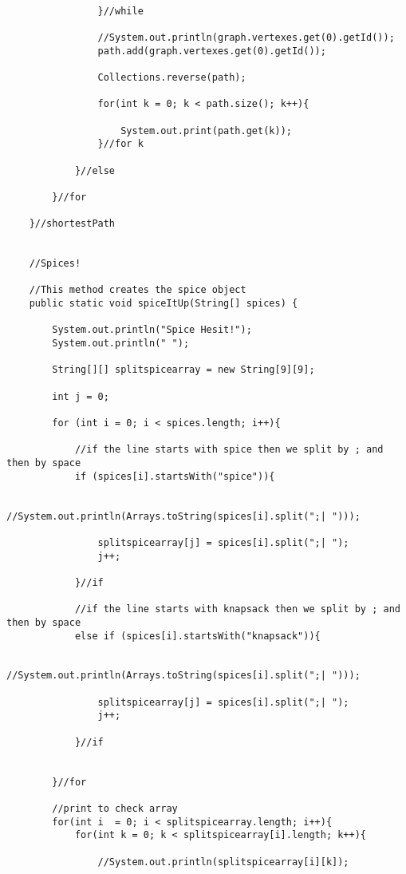 \documentclass[letterpaper, 10pt,DIV=13]{scrartcl}
\numberwithin{equation}{section} %
\numberwithin{figure}{section} %
\numberwithin{table}{section} %
\begin{document}
\begin{lstlisting}[frame=single, ]
                    
                }//while

                //System.out.println(graph.vertexes.get(0).getId());
                path.add(graph.vertexes.get(0).getId());

                Collections.reverse(path);

                for(int k = 0; k < path.size(); k++){

                    System.out.print(path.get(k));
                }//for k
                
            }//else

        }//for

    }//shortestPath

    
    //Spices!

    //This method creates the spice object
    public static void spiceItUp(String[] spices) {

        System.out.println("Spice Hesit!");
        System.out.println(" ");

        String[][] splitspicearray = new String[9][9];
        
        int j = 0;

        for (int i = 0; i < spices.length; i++){

            //if the line starts with spice then we split by ; and then by space
            if (spices[i].startsWith("spice")){
                
                //System.out.println(Arrays.toString(spices[i].split(";| ")));

                splitspicearray[j] = spices[i].split(";| ");
                j++;

            }//if

            //if the line starts with knapsack then we split by ; and then by space
            else if (spices[i].startsWith("knapsack")){

                //System.out.println(Arrays.toString(spices[i].split(";| ")));

                splitspicearray[j] = spices[i].split(";| ");
                j++;

            }//if
            
            
        }//for

        //print to check array
        for(int i  = 0; i < splitspicearray.length; i++){
            for(int k = 0; k < splitspicearray[i].length; k++){

                //System.out.println(splitspicearray[i][k]);


\end{lstlisting}
\end{document}
